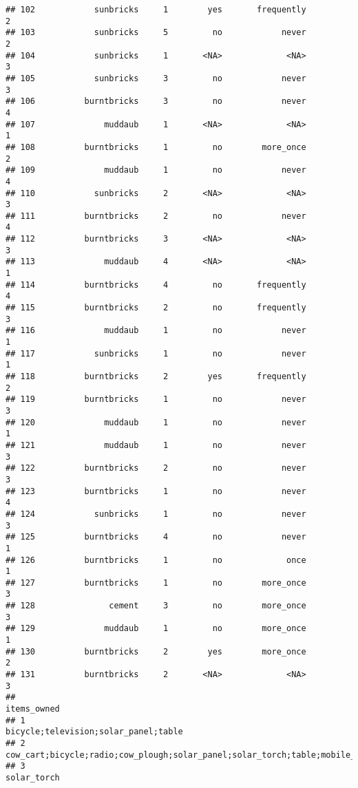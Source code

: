 \documentclass[
]{article}
\begin{document}
\begin{verbatim}
## 102            sunbricks     1        yes       frequently         2
## 103            sunbricks     5         no            never         2
## 104            sunbricks     1       <NA>             <NA>         3
## 105            sunbricks     3         no            never         3
## 106          burntbricks     3         no            never         4
## 107              muddaub     1       <NA>             <NA>         1
## 108          burntbricks     1         no        more_once         2
## 109              muddaub     1         no            never         4
## 110            sunbricks     2       <NA>             <NA>         3
## 111          burntbricks     2         no            never         4
## 112          burntbricks     3       <NA>             <NA>         3
## 113              muddaub     4       <NA>             <NA>         1
## 114          burntbricks     4         no       frequently         4
## 115          burntbricks     2         no       frequently         3
## 116              muddaub     1         no            never         1
## 117            sunbricks     1         no            never         1
## 118          burntbricks     2        yes       frequently         2
## 119          burntbricks     1         no            never         3
## 120              muddaub     1         no            never         1
## 121              muddaub     1         no            never         3
## 122          burntbricks     2         no            never         3
## 123          burntbricks     1         no            never         4
## 124            sunbricks     1         no            never         3
## 125          burntbricks     4         no            never         1
## 126          burntbricks     1         no             once         1
## 127          burntbricks     1         no        more_once         3
## 128               cement     3         no        more_once         3
## 129              muddaub     1         no        more_once         1
## 130          burntbricks     2        yes        more_once         2
## 131          burntbricks     2       <NA>             <NA>         3
##                                                                                                                                  items_owned
## 1                                                                                                       bicycle;television;solar_panel;table
## 2                                                               cow_cart;bicycle;radio;cow_plough;solar_panel;solar_torch;table;mobile_phone
## 3                                                                                                                                solar_torch

\end{verbatim}
\end{document}
